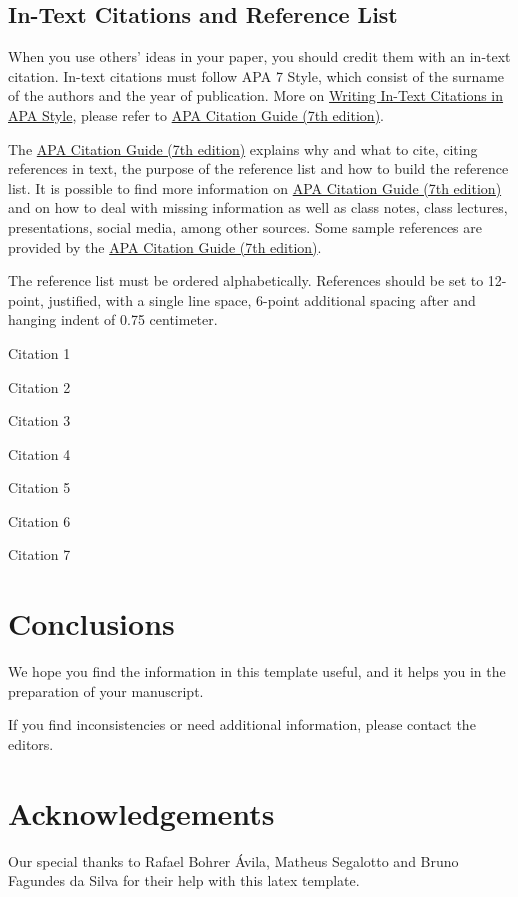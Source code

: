 \documentclass[english, spanish, brazilian]{RBIEarticle} %
\begin{document}
\subsection{In-Text Citations and Reference List}

When you use others' ideas in your paper, you should credit them with an in-text citation. In-text citations must follow APA 7 Style, which consist of the surname of the authors and the year of publication. More on \href{https://apastyle.apa.org/}{Writing In-Text Citations in APA Style}, please refer to \href{https://libguides.brenau.edu/APA7}{APA Citation Guide (7th edition)}.

The  \href{https://libguides.brenau.edu/APA7}{APA Citation Guide (7th edition)} explains why and what to cite, citing references in text, the purpose of the reference list and how to build the reference list. It is possible to find more information on  \href{https://libguides.brenau.edu/APA7}{APA Citation Guide (7th edition)} and on how to deal with missing information as well as class notes, class lectures, presentations, social media, among other sources. Some sample references are provided by the  \href{https://libguides.brenau.edu/APA7}{APA Citation Guide (7th edition)}.

The reference list must be ordered alphabetically. References should be set to 12-point, justified, with a single line space, 6-point additional spacing after and hanging indent of 0.75 centimeter.

Citation 1 \parencite{Baker2011}

Citation 2 \parencite{Seffrin2013}

Citation 3 \parencite{Brasil2008}

Citation 4 \parencite{Kautzman2015}

Citation 5 \parencite{Sweller1991}

Citation 6 \parencite{Clark2006}

Citation 7 \parencite{Mason2012}


\section{Conclusions}
We hope you find the information in this template useful, and it helps you in the preparation of your manuscript.

If you find inconsistencies or need additional information, please contact the editors.


\section*{Acknowledgements}
Our special thanks to Rafael Bohrer Ávila, Matheus Segalotto and Bruno Fagundes da Silva for their help with this latex template. 
\end{document}
